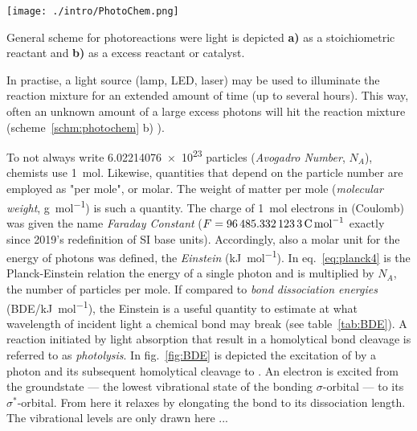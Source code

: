 	\begin{scheme}[h]%
		\centering
		\label{schm:photochem}
		\texttt{[image: ./intro/PhotoChem.png]}
		\caption{General scheme for photoreactions were light is depicted \textbf{a)} as a stoichiometric reactant and \textbf{b)} as a excess reactant or catalyst.}
	\end{scheme}

	In practise, a light source (lamp, LED, laser) may be used to illuminate the reaction mixture for an extended amount of time (up to several hours). This way, often an unknown amount of a large excess photons will hit the reaction mixture (scheme~\ref{schm:photochem} b) ). %

	To not always write \num{6.02214076e23} particles (\emph{Avogadro Number}, $N_A$), chemists use \qty{1}{\mol}. Likewise, quantities that depend on the particle number are employed as "per mole", or molar. The weight of matter per mole (\emph{molecular weight}, \unit{\g\per\mol}) is such a quantity. The charge of \qty{1}{\mol} electrons in \unit{\C} (Coulomb) was given the name \emph{Faraday Constant} ($F = \qty{96485.3321233}{\C\per\mol}$ exactly since 2019's redefinition of SI base units). Accordingly, also a molar unit for the energy of photons was defined, the \emph{Einstein} (\unit{\kJ\per\mol}). In eq.~\ref{eq:planck4} is the Planck-Einstein relation the energy of a single photon and is multiplied by $N_A$, the number of particles per mole. If compared to \emph{bond dissociation energies} (BDE/\unit{\kJ\per\mol}), the Einstein is a useful quantity to estimate at what wavelength of incident light a chemical bond may break (see table~\ref{tab:BDE}). %
	A reaction initiated by light absorption that result in a homolytical bond cleavage is referred to as \emph{photolysis}. In fig.~\ref{fig:BDE} is depicted the excitation of  by a photon and its subsequent homolytical cleavage to . An electron is excited from the groundstate --- the lowest vibrational state of the bonding $\sigma$-orbital --- to its $\sigma^\ast$-orbital. From here it relaxes by elongating the  bond to its dissociation length. The vibrational levels are only drawn here  ...

	
